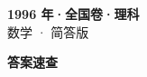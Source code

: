 \documentclass[zihao=-4, a4paper]{ctexart}
\begin{document}
\begin{center}
  {\Large\bfseries 1996 年·全国卷·理科}\\[4pt]
  {\large 数学 · 简答版}
\end{center}
\medskip
{}

\clearpage
{}
\begin{center}{\Large\bfseries 答案速查}\end{center}
\medskip

\end{document}
